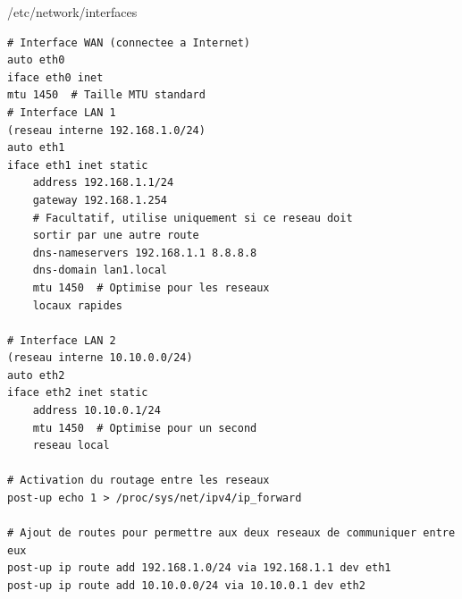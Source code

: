\documentclass{article}
\begin{document}
\begin{configbox}{/etc/network/interfaces}
    \begin{lstlisting}
# Interface WAN (connectee a Internet)
auto eth0
iface eth0 inet 
mtu 1450  # Taille MTU standard
# Interface LAN 1 
(reseau interne 192.168.1.0/24)
auto eth1
iface eth1 inet static
    address 192.168.1.1/24
    gateway 192.168.1.254  
    # Facultatif, utilise uniquement si ce reseau doit 
    sortir par une autre route
    dns-nameservers 192.168.1.1 8.8.8.8
    dns-domain lan1.local
    mtu 1450  # Optimise pour les reseaux 
    locaux rapides

# Interface LAN 2 
(reseau interne 10.10.0.0/24)
auto eth2
iface eth2 inet static
    address 10.10.0.1/24
    mtu 1450  # Optimise pour un second 
    reseau local

# Activation du routage entre les reseaux
post-up echo 1 > /proc/sys/net/ipv4/ip_forward

# Ajout de routes pour permettre aux deux reseaux de communiquer entre eux
post-up ip route add 192.168.1.0/24 via 192.168.1.1 dev eth1 
post-up ip route add 10.10.0.0/24 via 10.10.0.1 dev eth2 
    \end{lstlisting}
\end{configbox}
\end{document}
